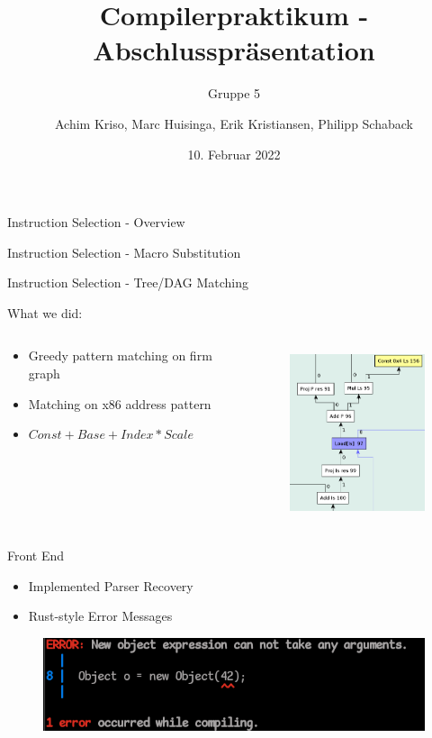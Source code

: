 \documentclass[en,16:9]{sdqbeamer}
\title[]{Compilerpraktikum - Abschlusspräsentation}
\subtitle{Gruppe 5}
\author[]{Achim Kriso, Marc Huisinga, Erik Kristiansen, Philipp Schaback}
\date[10.\,2.\,2022]{10. Februar 2022}
\begin{document}
\KITtitleframe

\begin{frame}{Instruction Selection - Overview}
\end{frame}

\begin{frame}{Instruction Selection - Macro Substitution}
\end{frame}

\begin{frame}{Instruction Selection - Tree/DAG Matching}
\end{frame}

\begin{frame}{What we did:}
	\begin{columns}
		\begin{column}{0.5\textwidth}
			\begin{itemize}
				\item Greedy pattern matching on firm graph
				\item Matching on x86 address pattern
				\item $Const + Base + Index * Scale$
			\end{itemize}
		\end{column}
		\begin{column}{0.5\textwidth}
			\begin{figure}
				\centering
				\includegraphics[draft,width=\linewidth,height=5cm]{images/memory-match-firm-graph.png}
			\end{figure}
		\end{column}
	\end{columns}
\end{frame}

\begin{frame}{Front End}
	\begin{itemize}
		\item Implemented Parser Recovery
		\item Rust-style Error Messages
	\end{itemize}

	\begin{figure}
		\centering
		\includegraphics{images/error_message.png}
	\end{figure}
\end{frame}
\end{document}
